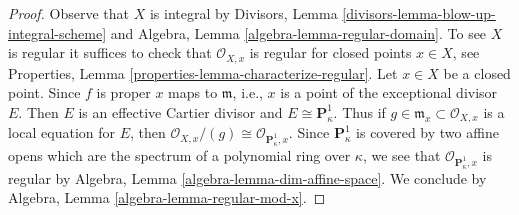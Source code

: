 \documentclass[10pt,a4paper]{amsart}
\theoremstyle{plain}
\theoremstyle{definition}
\theoremstyle{remark}
\numberwithin{equation}{subsection}
\begin{document}
\begin{proof}
Observe that $X$ is integral by
Divisors, Lemma \ref{divisors-lemma-blow-up-integral-scheme}
and
Algebra, Lemma \ref{algebra-lemma-regular-domain}.
To see $X$ is regular it suffices to check that $\mathcal{O}_{X, x}$
is regular for closed points $x \in X$, see
Properties, Lemma \ref{properties-lemma-characterize-regular}.
Let $x \in X$ be a closed point. Since $f$ is proper $x$ maps to
$\mathfrak m$, i.e., $x$ is a point of the exceptional divisor $E$.
Then $E$ is an effective Cartier divisor and $E \cong \mathbf{P}^1_\kappa$.
Thus if $g \in \mathfrak m_x \subset \mathcal{O}_{X, x}$ is a local
equation for $E$, then
$\mathcal{O}_{X, x}/(g) \cong \mathcal{O}_{\mathbf{P}^1_\kappa, x}$.
Since $\mathbf{P}^1_\kappa$ is covered by two affine opens which are the
spectrum of a polynomial ring over $\kappa$, we see that
$\mathcal{O}_{\mathbf{P}^1_\kappa, x}$ is regular by
Algebra, Lemma \ref{algebra-lemma-dim-affine-space}.
We conclude by
Algebra, Lemma \ref{algebra-lemma-regular-mod-x}.
\end{proof}
\end{document}
